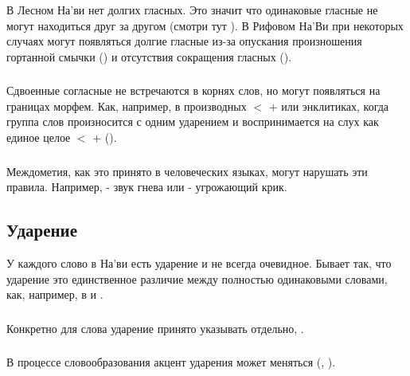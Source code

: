 \subsubsection{} В Лесном На'ви нет долгих гласных. Это значит что одинаковые гласные не могут находиться друг за другом (смотри тут
).  В Рифовом На'Ви при некоторых случаях могут появляться долгие гласные из-за опускания произношения гортанной смыч\-ки  () и отсутствия сокращения гласных
(). 

\subsubsection{} Сдвоенные согласные не встречаются в корнях слов, но могут появляться на границах морфем. Как, например, в производных
 $<$  $+$  или эн\-кли\-ти\-ках, 
когда группа слов произносится с одним ударением и воспринимается на слух как единое целое 
 $<$  $+$  ().

\subsubsection{} Междометия, как это принято в человеческих языках, могут нарушать эти правила. Например,  - звук гнева или 
 - угрожающий крик.


\subsection{Ударение}
У каждого слово в На'ви есть ударение и не всегда очевидное.  Бывает так, что ударение это единственное различие между полностью одинаковыми словами, как, например, в  
и  .

\subsubsection{} Конкретно для слова  ударение принято указывать отдельно, .

\subsubsection{} В процессе словообразования акцент ударения может меняться
(, ).

